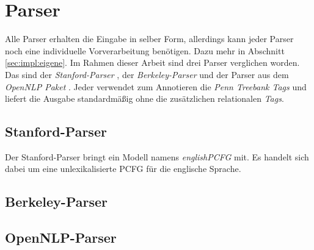 \section{Parser}

Alle Parser erhalten die Eingabe in selber Form, allerdings kann jeder Parser noch eine individuelle Vorverarbeitung benötigen. Dazu mehr in Abschnitt \ref{sec:impl:eigene}.
Im Rahmen dieser Arbeit sind drei Parser verglichen worden. Das sind der \textit{Stanford-Parser} \cite{stanfordparser}, der \textit{Berkeley-Parser} \cite{berkeleyparser1} und der Parser aus dem \textit{OpenNLP Paket} \cite{openNlpManual}. Jeder verwendet zum Annotieren die \textit{Penn Treebank Tags} und liefert die Ausgabe standardmäßig ohne die zusätzlichen relationalen \textit{Tags}. 



\subsection{Stanford-Parser}
Der Stanford-Parser bringt ein Modell namens \textit{englishPCFG} mit. Es handelt sich dabei um eine unlexikalisierte PCFG für die englische Sprache. 
\subsection{Berkeley-Parser}

\subsection{OpenNLP-Parser}


